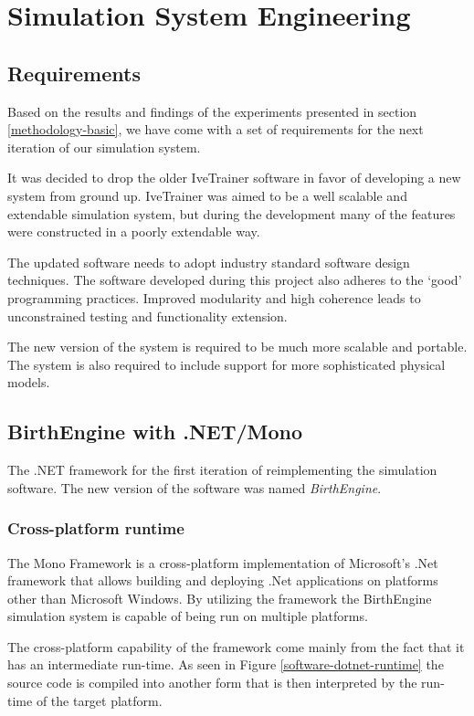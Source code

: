 \section{Simulation System Engineering}\label{methodology-software}

\subsection{Requirements}

Based on the results and findings of the experiments presented in section \ref{methodology-basic}, we have come with a set of requirements for the next iteration of our simulation system.

It was decided to drop the older IveTrainer software in favor of developing a new system from ground up. IveTrainer was aimed to be a well scalable and extendable simulation system, but during the development many of the features were constructed in a poorly extendable way.

The updated software needs to adopt industry standard software design techniques. The software developed during this project also adheres to the `good' programming practices. Improved modularity and high coherence leads to unconstrained testing and functionality extension.

The new version of the system is required to be much more scalable and portable. The system is also required to include support for more sophisticated physical models.

\subsection{BirthEngine with .NET/Mono}

  The .NET framework for the first iteration of reimplementing the simulation software. The new version of the software was named \textit{BirthEngine}.

  \subsubsection{Cross-platform runtime}
    The Mono Framework \citep{mono_framework} is a cross-platform implementation of Microsoft's .Net framework that allows building and deploying .Net applications on platforms other than Microsoft Windows. By utilizing the framework the BirthEngine simulation system is capable of being run on multiple platforms.

  The cross-platform capability of the framework come mainly from the fact that it has an intermediate run-time. As seen in Figure \ref{software-dotnet-runtime} the source code is compiled into another form that is then interpreted by the run-time of the target platform.

